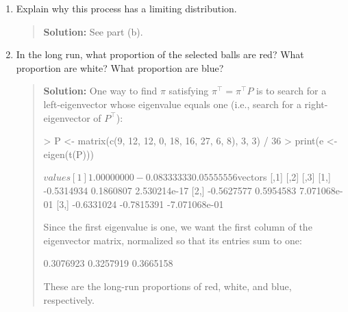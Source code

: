 \documentclass{article}
\begin{document}
\begin{enumerate}
\begin{enumerate}
    \item Explain why this process has a limiting distribution.
    \begin{quotation}{\bf Solution:}
    See part (b).
    \end{quotation}

    \item In the long run, what proportion of the selected balls are red? What
    proportion are white? What proportion are blue?
    \begin{quotation}{\bf Solution:}
    One way to find $\pi$ satisfying $\pi^\top=\pi^\top P$ is to search for a left-eigenvector whose
    eigenvalue equals one (i.e., search for a right-eigenvector of $P^\top$):
\begin{Schunk}
\begin{Sinput}
> P <- matrix(c(9, 12, 12, 0, 18, 16, 27, 6, 8), 3, 3) / 36
> print(e <- eigen(t(P)))
\end{Sinput}
\begin{Soutput}
$values
[1]  1.00000000 -0.08333333  0.05555556

$vectors
           [,1]       [,2]          [,3]
[1,] -0.5314934  0.1860807  2.530214e-17
[2,] -0.5627577  0.5954583  7.071068e-01
[3,] -0.6331024 -0.7815391 -7.071068e-01
\end{Soutput}
\end{Schunk}
    Since the first eigenvalue is one, we want the first column of the eigenvector matrix, normalized
    so that its entries sum to one:
\begin{Schunk}
\begin{Soutput}
[1] 0.3076923 0.3257919 0.3665158
\end{Soutput}
\end{Schunk}
    These are the long-run proportions of
    red, white, and blue, respectively.
    \end{quotation}


\end{enumerate}
\end{enumerate}
\end{document}
